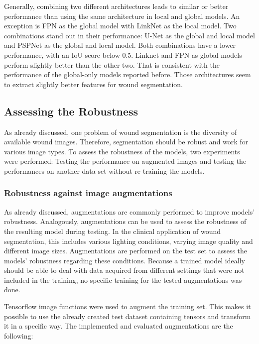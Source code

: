 Generally, combining two different architectures leads to similar or better performance than using the same architecture in local and global models. An exception is FPN as the global model with LinkNet as the local model. Two combinations stand out in their performance: U-Net as the global and local model and PSPNet as the global and local model. Both combinations have a lower performance, with an IoU score below 0.5. Linknet and FPN as global models perform slightly better than the other two. That is consistent with the performance of the global-only models reported before. Those architectures seem to extract slightly better features for wound segmentation.

\subsection{Assessing the Robustness}

As already discussed, one problem of wound segmentation is the diversity of available wound images. Therefore, segmentation should be robust and work for various image types. To assess the robustness of the models, two experiments were performed: Testing the performance on augmented images and testing the performances on another data set without re-training the models.

\subsubsection{Robustness against image augmentations}

As already discussed, augmentations are commonly performed to improve models' robustness. Analogously, augmentations can be used to assess the robustness of the resulting model during testing. In the clinical application of wound segmentation, this includes various lighting conditions, varying image quality and different image sizes. Augmentations are performed on the test set to assess the models' robustness regarding these conditions. Because a trained model ideally should be able to deal with data acquired from different settings that were not included in the training, no specific training for the tested augmentations was done.

Tensorflow image functions were used to augment the training set. This makes it possible to use the already created test dataset containing tensors and transform it in a specific way. The implemented and evaluated augmentations are the following:

